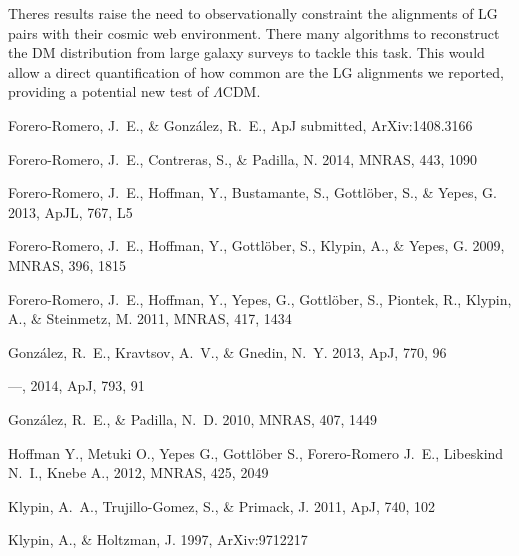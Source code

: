 \documentclass{iau}
\newcommand{\apj}{ApJ}
\newcommand{\apjl}{ApJL}
\newcommand{\mnras}{MNRAS}
\begin{document}
Theres results  raise the need to observationally constraint
the alignments of LG pairs with their cosmic web environment. There
many algorithms to reconstruct the DM distribution from large galaxy
surveys to tackle this task.  This would allow a direct
quantification of how common are the LG alignments we reported,
providing a potential new test of $\Lambda$CDM. 




 

\begin{thebibliography}{}


{{Forero-Romero}, J.~E., \& {Gonz{\'a}lez}, R.~E.}, ApJ submitted,
ArXiv:1408.3166 

{Forero-Romero}, J.~E., {Contreras}, S., \& {Padilla}, N. 2014, \mnras, 443,
1090

{Forero-Romero}, J.~E., {Hoffman}, Y., {Bustamante}, S., {Gottl{\"o}ber}, S.,
\& {Yepes}, G. 2013, \apjl, 767, L5

{Forero-Romero}, J.~E., {Hoffman}, Y., {Gottl{\"o}ber}, S., {Klypin}, A., \&
{Yepes}, G. 2009, \mnras, 396, 1815

{Forero-Romero}, J.~E., {Hoffman}, Y., {Yepes}, G., {Gottl{\"o}ber}, S.,
{Piontek}, R., {Klypin}, A., \& {Steinmetz}, M. 2011, \mnras, 417, 1434


{Gonz{\'a}lez}, R.~E., {Kravtsov}, A.~V., \& {Gnedin}, N.~Y. 2013, \apj, 770,
96

---, 2014, \apj, 793, 91


{Gonz{\'a}lez}, R.~E., \& {Padilla}, N.~D. 2010, \mnras, 407, 1449


 {Hoffman} Y., {Metuki} O., {Yepes}
  G., {Gottl{\"o}ber} S., {Forero-Romero} J.~E., {Libeskind} N.~I.,
  {Knebe} A., 2012, \mnras, 425, 2049 

{Klypin}, A.~A., {Trujillo-Gomez}, S., \& {Primack}, J. 2011, \apj,
740, 102

{Klypin}, A., \& {Holtzman}, J. 1997, ArXiv:9712217


\end{thebibliography}
\end{document}
